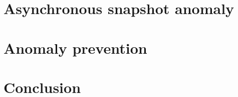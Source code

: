 \documentclass[sigconf]{acmart}
\theoremstyle{remark}
\begin{document}
    \section {Asynchronous snapshot anomaly}
    
    
    \section{Anomaly prevention}
    
    
    \section{Conclusion}
    

    
    
\end{document}
